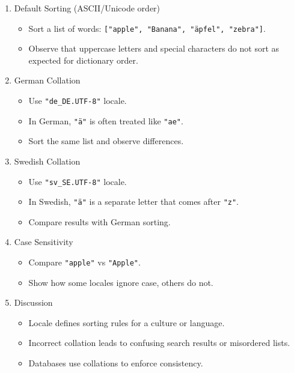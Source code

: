 \documentclass[
  letterpaper,
  DIV=11,
  numbers=noendperiod]{scrreprt}
\providecommand{\tightlist}{%
  \setlength{\itemsep}{0pt}\setlength{\parskip}{0pt}}
\begin{document}
\begin{enumerate}
\def\labelenumi{\arabic{enumi}.}
\item
  Default Sorting (ASCII/Unicode order)

  \begin{itemize}
  \tightlist
  \item
    Sort a list of words:
    \texttt{{[}"apple",\ "Banana",\ "äpfel",\ "zebra"{]}}.
  \item
    Observe that uppercase letters and special characters do not sort as
    expected for dictionary order.
  \end{itemize}
\item
  German Collation

  \begin{itemize}
  \tightlist
  \item
    Use \texttt{"de\_DE.UTF-8"} locale.
  \item
    In German, \texttt{"ä"} is often treated like \texttt{"ae"}.
  \item
    Sort the same list and observe differences.
  \end{itemize}
\item
  Swedish Collation

  \begin{itemize}
  \tightlist
  \item
    Use \texttt{"sv\_SE.UTF-8"} locale.
  \item
    In Swedish, \texttt{"ä"} is a separate letter that comes after
    \texttt{"z"}.
  \item
    Compare results with German sorting.
  \end{itemize}
\item
  Case Sensitivity

  \begin{itemize}
  \tightlist
  \item
    Compare \texttt{"apple"} vs \texttt{"Apple"}.
  \item
    Show how some locales ignore case, others do not.
  \end{itemize}
\item
  Discussion

  \begin{itemize}
  \tightlist
  \item
    Locale defines sorting rules for a culture or language.
  \item
    Incorrect collation leads to confusing search results or misordered
    lists.
  \item
    Databases use collations to enforce consistency.
  \end{itemize}
\end{enumerate}
\end{document}

